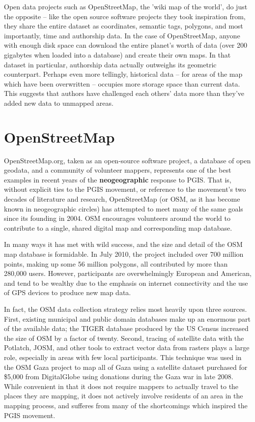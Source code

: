 \documentclass[11pt,oneside,notitlepage]{report}
\begin{document}
Open data projects such as OpenStreetMap, the 'wiki map of the world', do just the opposite – like the open source software projects they took inspiration from, they share the entire dataset as coordinates, semantic tags, polygons, and most importantly, time and authorship data. In the case of OpenStreetMap, anyone with enough disk space can download the entire planet's worth of data (over 200 gigabytes when loaded into a database) and create their own maps. In that dataset in particular, authorship data actually outweighs its geometric counterpart. Perhaps even more tellingly, historical data – for areas of the map which have been overwritten – occupies more storage space than current data. This suggests that authors have challenged each others' data more than they've added new data to unmapped areas. \cite{warren2009composition}

\section{OpenStreetMap}
\label{sec:openstreetmap}

OpenStreetMap.org, taken as an open-source software project, a database of open geodata, and a community of volunteer mappers, represents one of the best examples in recent years of the \textbf{neogeographic} response to PGIS. That is, without explicit ties to the PGIS movement, or reference to the movement's two decades of literature and research, OpenStreetMap (or OSM, as it has become known in neogeographic circles) has attempted to meet many of the same goals since its founding in 2004. OSM encourages volunteers around the world to contribute to a single, shared digital map and corresponding map database. \cite{chilton-crowdsourcing} 

In many ways it has met with wild success, and the size and detail of the OSM map database is formidable. In July 2010, the project included over 700 million points, making up some 56 million polygons, all contributed by more than 280,000 users. \cite{osm2010stats} However, participants are overwhelmingly European and American, and tend to be wealthy due to the emphasis on internet connectivity and the use of GPS devices to produce new map data.

In fact, the OSM data collection strategy relies most heavily upon three sources. First, existing municipal and public domain databases make up an enormous part of the available data; the TIGER database produced by the US Census increased the size of OSM by a factor of twenty. \cite{willis2007osm} Second, tracing of satellite data with the Potlatch, JOSM, and other tools to extract vector data from rasters plays a large role, especially in areas with few local participants. This technique was used in the OSM Gaza project to map all of Gaza using a satellite dataset purchased for \$5,000 from DigitalGlobe using donations during the Gaza war in late 2008. \cite{maron2010openstreetmap}\cite{chilton-crowdsourcing} While convenient in that it does not require mappers to actually travel to the places they are mapping, it does not actively involve residents of an area in the mapping process, and sufferes from many of the shortcomings which inspired the PGIS movement. 
\end{document}
